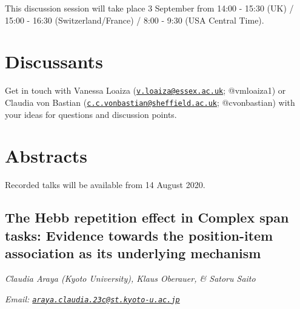 \documentclass[
  12pt,
]{book}
\begin{document}
This discussion session will take place 3 September from 14:00 - 15:30 (UK) / 15:00 - 16:30 (Switzerland/France) / 8:00 - 9:30 (USA Central Time).

\hypertarget{discussants-4}{%
\section{Discussants}\label{discussants-4}}

Get in touch with Vanessa Loaiza (\href{mailto:v.loaiza@essex.ac.uk}{\nolinkurl{v.loaiza@essex.ac.uk}}; @vmloaiza1) or Claudia von Bastian (\href{mailto:c.c.vonbastian@sheffield.ac.uk}{\nolinkurl{c.c.vonbastian@sheffield.ac.uk}}; @cvonbastian) with your ideas for questions and discussion points.

\hypertarget{abstracts-4}{%
\section{Abstracts}\label{abstracts-4}}

Recorded talks will be available from 14 August 2020.

\hypertarget{the-hebb-repetition-effect-in-complex-span-tasks-evidence-towards-the-position-item-association-as-its-underlying-mechanism}{%
\subsection{The Hebb repetition effect in Complex span tasks: Evidence towards the position-item association as its underlying mechanism}\label{the-hebb-repetition-effect-in-complex-span-tasks-evidence-towards-the-position-item-association-as-its-underlying-mechanism}}

\emph{Claudia Araya (Kyoto University), Klaus Oberauer, \& Satoru Saito}

\emph{Email: \href{mailto:araya.claudia.23c@st.kyoto-u.ac.jp}{\nolinkurl{araya.claudia.23c@st.kyoto-u.ac.jp}}}
\end{document}
